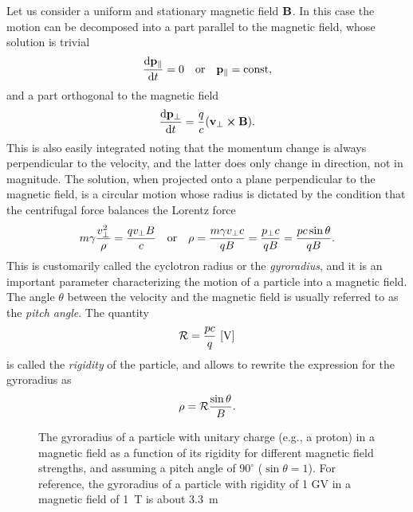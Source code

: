 Let us consider a uniform and stationary magnetic field $\vb{B}$. In this case
the motion can be decomposed into a part parallel to the magnetic field, whose
solution is trivial
\begin{align*}
  \dv{\vb{p}_\parallel}{t} = 0
  \quad\text{or}\quad
  \vb{p}_\parallel = \text{const},
\end{align*}
and a part orthogonal to the magnetic field
\begin{align*}
  \dv{\vb{p}_\perp}{t} = \frac{q}{c} (\vb{v}_\perp \cross \vb{B}).
\end{align*}
This is also easily integrated noting that the momentum change is always
perpendicular to the velocity, and the latter does only change in direction, not
in magnitude. The solution, when projected onto a plane perpendicular to the
magnetic field, is a circular motion whose radius is dictated by the condition
that the centrifugal force balances the Lorentz force
\begin{align}\label{eq:gyrorad}
  m \gamma \frac{v_\perp^2}{\rho} = \frac{qv_\perp B}{c}
  \quad\text{or}\quad
  \rho = \frac{m\gamma v_\perp c}{qB} = \frac{p_\perp c}{qB} =
  \frac{pc\sin\theta}{qB}.
\end{align}
This is customarily called the cyclotron radius or  the \emph{gyroradius}, and it
is an important parameter characterizing the motion of a particle into a magnetic
field. The angle $\theta$ between the velocity and the magnetic field is usually
referred to as the \emph{pitch angle}. The quantity
\begin{align}
  \mathcal{R} = \frac{pc}{q}~\text{[V]}
\end{align}
is called the \emph{rigidity}
of the particle, and allows to rewrite the expression for the gyroradius as
\begin{align*}
  \rho = \mathcal{R} \frac{\sin\theta}{B}.
\end{align*}

\begin{figure}[htbp!]
	
	\caption{The gyroradius of a particle with unitary charge (e.g., a proton)
    in a magnetic field as a function of its rigidity for different magnetic
    field strengths, and assuming a pitch angle of $90^\circ$ ($\sin\theta=1$).
    For reference, the gyroradius of a particle with rigidity of 1 GV in a
    magnetic field of 1~T is about 3.3~m}
\end{figure}


